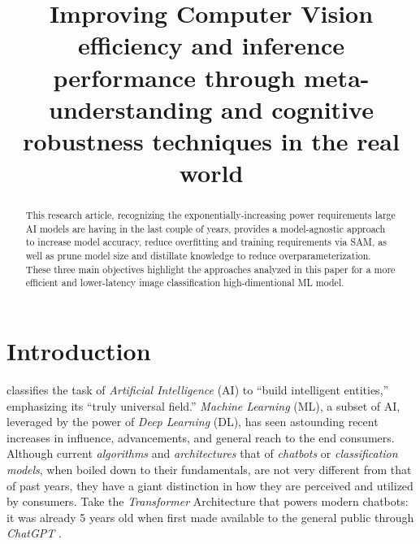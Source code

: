 \documentclass[conference]{IEEEtran}
\begin{document}
\title{\bfseries Improving Computer Vision efficiency and inference performance through meta-understanding and cognitive robustness techniques in the real world }

\author{
}

\maketitle

\begin{abstract}
This research article, recognizing the exponentially-increasing power requirements large AI models are having in the last couple of years, provides a model-agnostic approach to increase model accuracy, reduce overfitting and training requirements via SAM, as well as prune model size and distillate knowledge to reduce overparameterization. These three main objectives highlight the approaches analyzed in this paper for a more efficient and lower-latency image classification high-dimentional ML model.
\end{abstract}

\IEEEpeerreviewmaketitle

\section{Introduction} \label{introduction}

\cite{aima2021} classifies the task of \textit{Artificial Intelligence} (AI) to ``build intelligent entities,'' emphasizing its ``truly universal field.'' \textit{Machine Learning} (ML), a subset of AI, leveraged by the power of \textit{Deep Learning} (DL), has seen astounding recent increases in influence, advancements, and general reach to the end consumers. Although current \textit{algorithms} and \textit{architectures} that of \textit{chatbots} or \textit{classification models}, when boiled down to their fundamentals, are not very different from that of past years, they have a giant distinction in how they are perceived and utilized by consumers. Take the \textit{Transformer} Architecture that powers modern chatbots: it was already 5 years old when first made available to the general public through \textit{ChatGPT} \cite{attention2017, chatgpt2022}.
\end{document}
